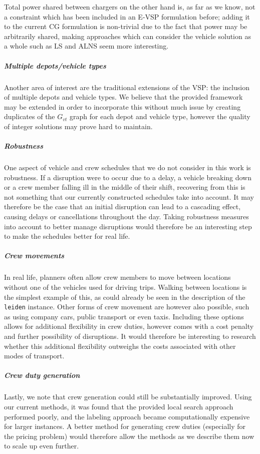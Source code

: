 \documentclass[]{article}
\begin{document}
Total power shared between chargers on the other hand is, as far as we know, not a constraint which has been included in an E-VSP formulation before; adding it to the current CG formulation is non-trivial due to the fact that power may be arbitrarily shared, making approaches which can consider the vehicle solution as a whole such as LS and ALNS seem more interesting.

\subparagraph{Multiple depots/vehicle types}
Another area of interest are the traditional extensions of the VSP: the inclusion of multiple depots and vehicle types. We believe that the provided framework may be extended in order to incorporate this without much issue by creating duplicates of the $G_{vt}$ graph for each depot and vehicle type, however the quality of integer solutions may prove hard to maintain. 

\subparagraph{Robustness}
One aspect of vehicle and crew schedules that we do not consider in this work is robustness. If a disruption were to occur due to a delay, a vehicle breaking down or a crew member falling ill in the middle of their shift, recovering from this is not something that our currently constructed schedules take into account. It may therefore be the case that an initial disruption can lead to a cascading effect, causing delays or cancellations throughout the day. Taking robustness measures into account to better manage disruptions would therefore be an interesting step to make the schedules better for real life. 

\subparagraph{Crew movements}
In real life, planners often allow crew members to move between locations without one of the vehicles used for driving trips. Walking between locations is the simplest example of this, as could already be seen in the description of the \texttt{leiden} instance. Other forms of crew movement are however also possible, such as using company cars, public transport or even taxis. Including these options allows for additional flexibility in crew duties, however comes with a cost penalty and further possibility of disruptions. It would therefore be interesting to research whether this additional flexibility outweighs the costs associated with other modes of transport.

\subparagraph{Crew duty generation}
Lastly, we note that crew generation could still be substantially improved. Using our current methods, it was found that the provided local search approach performed poorly, and the labeling approach became computationally expensive for larger instances. A better method for generating crew duties (especially for the pricing problem) would therefore allow the methods as we describe them now to scale up even further. 
\printbibliography
\end{document}
